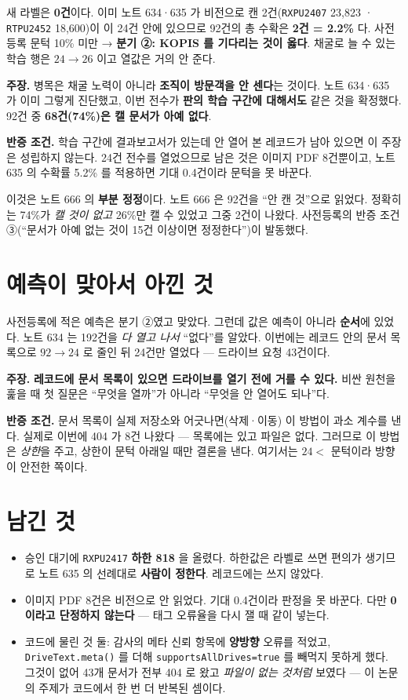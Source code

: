 \documentclass[10pt,a4paper]{article}
\newcommand{\claim}[2]{\begin{claimbox}\textbf{주장.} #1\par\smallskip
  \textcolor{gray!70}{\textbf{반증 조건.} #2}\end{claimbox}}
\begin{document}
새 라벨은 \textbf{0건}이다. 이미 노트 634·635 가 비전으로 캔 2건(\verb|RXPU2407|
23{,}823 · \verb|RTPU2452| 18{,}600)이 이 24건 안에 있으므로 92건의 총 수확은
\textbf{2건 = 2.2\%} 다. 사전등록 문턱 10\% 미만 → \textbf{분기 ②: KOPIS 를
기다리는 것이 옳다}. 채굴로 늘 수 있는 학습 행은 $24 \to 26$ 이고 열값은 거의 안 준다.

\claim{병목은 채굴 노력이 아니라 \textbf{조직이 방문객을 안 센다}는 것이다. 노트
634·635 가 이미 그렇게 진단했고, 이번 전수가 \textbf{판의 학습 구간에 대해서도}
같은 것을 확정했다. 92건 중 \textbf{68건(74\%)은 캘 문서가 아예 없다}.}
{학습 구간에 결과보고서가 있는데 안 열어 본 레코드가 남아 있으면 이 주장은
성립하지 않는다. 24건 전수를 열었으므로 남은 것은 이미지 PDF 8건뿐이고,
노트 635 의 수확률 5.2\% 를 적용하면 기대 0.4건이라 문턱을 못 바꾼다.}

이것은 노트 666 의 \textbf{부분 정정}이다. 노트 666 은 92건을 ``안 캔 것''으로
읽었다. 정확히는 74\%가 \emph{캘 것이 없고} 26\%만 캘 수 있었고 그중 2건이 나왔다.
사전등록의 반증 조건 ③(``문서가 아예 없는 것이 15건 이상이면 정정한다'')이 발동했다.

\section{예측이 맞아서 아낀 것}

사전등록에 적은 예측은 분기 ②였고 맞았다. 그런데 값은 예측이 아니라 \textbf{순서}에
있었다. 노트 634 는 192건을 \emph{다 열고 나서} ``없다''를 알았다. 이번에는
레코드 안의 문서 목록으로 $92 \to 24$ 로 줄인 뒤 24건만 열었다 --- 드라이브 요청
43건이다.

\claim{\textbf{레코드에 문서 목록이 있으면 드라이브를 열기 전에 거를 수 있다.}
비싼 원천을 훑을 때 첫 질문은 ``무엇을 열까''가 아니라 ``무엇을 안 열어도 되나''다.}
{문서 목록이 실제 저장소와 어긋나면(삭제·이동) 이 방법이 과소 계수를 낸다.
실제로 이번에 404 가 8건 나왔다 --- 목록에는 있고 파일은 없다. 그러므로 이 방법은
\emph{상한}을 주고, 상한이 문턱 아래일 때만 결론을 낸다. 여기서는 $24 < $ 문턱이라
방향이 안전한 쪽이다.}

\section{남긴 것}

\begin{itemize}
\item 승인 대기에 \verb|RXPU2417| \textbf{하한 818} 을 올렸다. 하한값은 라벨로
      쓰면 편의가 생기므로 노트 635 의 선례대로 \textbf{사람이 정한다}. 레코드에는
      쓰지 않았다.
\item 이미지 PDF 8건은 비전으로 안 읽었다. 기대 0.4건이라 판정을 못 바꾼다.
      다만 \textbf{0 이라고 단정하지 않는다} --- 태그 오류율을 다시 잴 때 같이 넣는다.
\item 코드에 물린 것 둘: 감사의 메타 신뢰 항목에 \textbf{양방향} 오류를 적었고,
      \verb|DriveText.meta()| 를 더해 \verb|supportsAllDrives=true| 를 빼먹지
      못하게 했다. 그것이 없어 43개 문서가 전부 404 로 왔고 \emph{파일이 없는
      것처럼} 보였다 --- 이 논문의 주제가 코드에서 한 번 더 반복된 셈이다.
\end{itemize}
\end{document}
